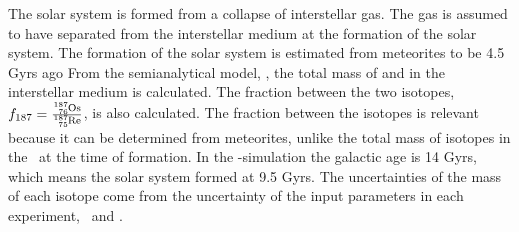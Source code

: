 The solar system is formed from a collapse of interstellar gas. The gas is assumed to have separated from the interstellar medium at the formation of the solar system.
The formation of the solar system is estimated from meteorites to be 4.5 Gyrs ago 
From the semianalytical model, \omegamodel, the total mass of  and  in the interstellar medium is calculated.
The fraction between the two isotopes, $f_{187} = \frac{\os{187}}{\re{187}}$, is also calculated.
The fraction between the isotopes is relevant because it can be determined from meteorites, unlike the total mass of isotopes in the \sos\ at the time of formation.
In the \eris-simulation the galactic age is 14 Gyrs, which means the solar system formed at 9.5 Gyrs.
The uncertainties of the mass of each isotope come from the uncertainty of the input parameters in each experiment, \expone\ and \exptwo.


\FloatBarrier

\setlength{\subfigwidth}{0.45\textwidth}
\setlength{\figwidth}{0.8\textwidth}

